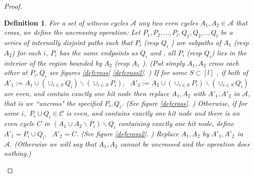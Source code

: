 \documentclass[letterpaper,11pt]{article}
\newtheorem{definition}[theorem]{Definition}
\newcommand{\0}{\mathbb{0}}
\newcommand{\1}{\mathbb{1}}
\begin{document}
\begin{proof}
\begin{definition}\label{uncrossing} \cite{GW98}
For  a set of witness cycles $ \mathcal{A} $ any two even cycles $A_1, A_2 \in \mathcal{A}$  that cross, we define the uncrossing operation: Let  $P_1, P_2 ,..., P_l ,Q_1, Q_2, .., Q_l$ be a series of internally disjoint paths such that $P_i$ (resp $Q_i$ )  are subpaths of $A_1$ (resp $A_2$)  for each $i$,  $P_i$ has the same endpoints as  $Q_i$  and , all $P_i$ (resp $Q_i$) lies in the interior of the region bounded by $A_2$ (resp $A_1$  ).  (Put simply $A_1 , A_2 $ cross each other at $P_i, Q_i $ see figures \ref{defcross} \ref{defcross2}. ) If 
 for some $ S\subset [l] $ , if both of  $ A'_1 := A_1 \cup  (\cup_{i \in S}  Q_i ) \backslash (\cup_{i \in S}  P_i ) ,  \ \ \ A'_2 :=  A_2 \cup  (\cup_{i \in S}  P_i ) \backslash (\cup_{i \in S}  Q_i )  $  are even, and contain exactly one hit node then replace $A_1, A_2$ with $A'_1, A'_2 $  in $\mathcal{A}  $, that is we ``uncross" the specified $P_i, Q_i$. (See figure \ref{defcross}. )  Otherwise, if for some $i,$  $P_i \cup Q_i \in \mathcal{C}  $ is even, and contains exactly one hit node and there is an even cycle $C$ in $ (A_1 \cup A_2 \backslash P_i ) \backslash Q_i $ containing exactly one hit node, define  $ A'_1=P_i \cup Q_i ,   \ \ \ A'_2=C$. (See figure \ref{defcross2}. )   Replace $A_1, A_2 $   by $A'_1, A'_2 $   in  $\mathcal{A} $. (Otherwise we will say that $A_1, A_2$ cannot be uncrossed and the operation does nothing.) 
 

\end{definition}
\end{proof}
\end{document}
